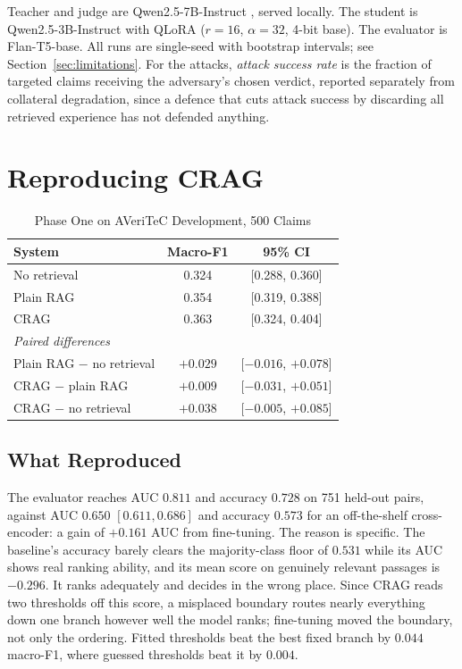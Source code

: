 \documentclass[journal]{IEEEtran}
\begin{document}
Teacher and judge are Qwen2.5-7B-Instruct \cite{qwen2024}, served locally. The
student is Qwen2.5-3B-Instruct with QLoRA ($r=16$, $\alpha=32$, 4-bit base). The
evaluator is Flan-T5-base. All runs are single-seed with bootstrap intervals;
see Section~\ref{sec:limitations}. For the attacks, \emph{attack success rate}
is the fraction of targeted claims receiving the adversary's chosen verdict,
reported separately from collateral degradation, since a defence that cuts
attack success by discarding all retrieved experience has not defended anything.

\section{Reproducing CRAG}
\label{sec:crag}

\begin{table}[!t]
\caption{Phase One on AVeriTeC Development, 500 Claims}
\label{tab:crag}
\centering
\begin{tabular}{lcc}
\toprule
System & Macro-F1 & 95\% CI \\
\midrule
No retrieval & 0.324 & [0.288, 0.360] \\
Plain RAG    & 0.354 & [0.319, 0.388] \\
CRAG         & 0.363 & [0.324, 0.404] \\
\midrule
\multicolumn{3}{l}{\emph{Paired differences}}\\
Plain RAG $-$ no retrieval & $+0.029$ & [$-0.016$, $+0.078$] \\
CRAG $-$ plain RAG         & $+0.009$ & [$-0.031$, $+0.051$] \\
CRAG $-$ no retrieval      & $+0.038$ & [$-0.005$, $+0.085$] \\
\bottomrule
\end{tabular}
\end{table}

\subsection{What Reproduced}
The evaluator reaches AUC $0.811$ and accuracy $0.728$ on 751 held-out pairs,
against AUC $0.650$ $[0.611, 0.686]$ and accuracy $0.573$ for an off-the-shelf
cross-encoder: a gain of $+0.161$ AUC from fine-tuning. The reason is specific.
The baseline's accuracy barely clears the majority-class floor of $0.531$ while
its AUC shows real ranking ability, and its mean score on genuinely relevant
passages is $-0.296$. It ranks adequately and decides in the wrong place. Since
CRAG reads two thresholds off this score, a misplaced boundary routes nearly
everything down one branch however well the model ranks; fine-tuning moved the
boundary, not only the ordering. Fitted thresholds beat the best fixed branch by
$0.044$ macro-F1, where guessed thresholds beat it by $0.004$.
\end{document}
